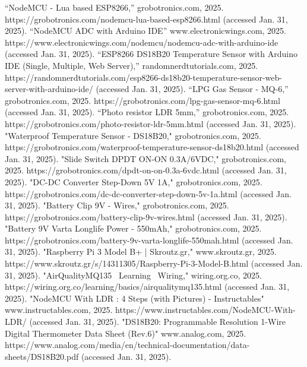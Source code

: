 \documentclass[conference]{IEEEtran}
\begin{document}
\begin{thebibliography}{00}
	 “NodeMCU - Lua based ESP8266,” grobotronics.com, 2025. https://grobotronics.com/nodemcu-lua-based-esp8266.html (accessed Jan. 31, 2025).
	 “NodeMCU ADC with Arduino IDE” www.electronicwings.com, 2025. https://www.electronicwings.com/nodemcu/nodemcu-adc-with-arduino-ide (accessed Jan. 31, 2025).
	 “ESP8266 DS18B20 Temperature Sensor with Arduino IDE (Single, Multiple, Web Server),” randomnerdtutorials.com, 2025. https://randomnerdtutorials.com/esp8266-ds18b20-temperature-sensor-web-server-with-arduino-ide/ (accessed Jan. 31, 2025).
	 “LPG Gas Sensor - MQ-6,” grobotronics.com, 2025. https://grobotronics.com/lpg-gas-sensor-mq-6.html (accessed Jan. 31, 2025).
	 “Photo resistor LDR 5mm,” grobotronics.com, 2025. https://grobotronics.com/photo-resistor-ldr-5mm.html (accessed Jan. 31, 2025).
	 "Waterproof Temperature Sensor - DS18B20," grobotronics.com, 2025. https://grobotronics.com/waterproof-temperature-sensor-ds18b20.html (accessed Jan. 31, 2025).
	 "Slide Switch DPDT ON-ON 0.3A/6VDC," grobotronics.com, 2025. https://grobotronics.com/dpdt-on-on-0.3a-6vdc.html (accessed Jan. 31, 2025).
	 "DC-DC Converter Step-Down 5V 1A," grobotronics.com, 2025. https://grobotronics.com/dc-dc-converter-step-down-5v-1a.html (accessed Jan. 31, 2025).
	 "Battery Clip 9V - Wires," grobotronics.com, 2025. https://grobotronics.com/battery-clip-9v-wires.html (accessed Jan. 31, 2025).
	 "Battery 9V Varta Longlife Power - 550mAh," grobotronics.com, 2025. https://grobotronics.com/battery-9v-varta-longlife-550mah.html (accessed Jan. 31, 2025).
	 "Raspberry Pi 3 Model B+ | Skroutz.gr," www.skroutz.gr, 2025. https://www.skroutz.gr/s/14311305/Raspberry-Pi-3-Model-B.html (accessed Jan. 31, 2025).
	 "AirQualityMQ135 \ Learning \ Wiring," wiring.org.co, 2025. https://wiring.org.co/learning/basics/airqualitymq135.html (accessed Jan. 31, 2025).
	 "NodeMCU With LDR : 4 Steps (with Pictures) - Instructables" www.instructables.com, 2025. https://www.instructables.com/NodeMCU-With-LDR/ (accessed Jan. 31, 2025).
	 "DS18B20: Programmable Resolution 1-Wire Digital Thermometer Data Sheet (Rev.6)" www.analog.com, 2025. https://www.analog.com/media/en/technical-documentation/data-sheets/DS18B20.pdf (accessed Jan. 31, 2025).
\end{thebibliography}
\end{document}
